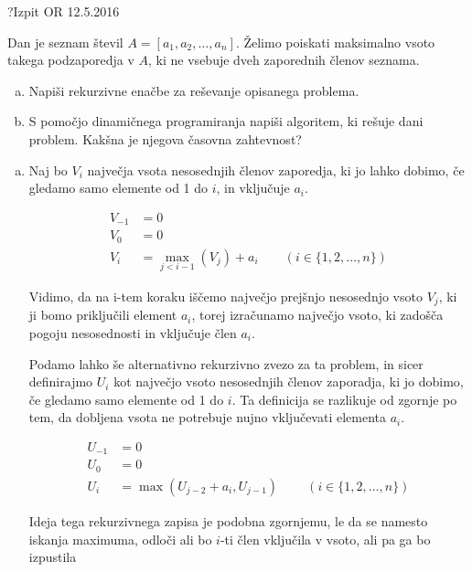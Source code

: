 \begin{naloga}{?}{Izpit OR 12.5.2016}
\begin{vprasanje}
Dan je seznam števil $A = [a_1, a_2, \dots, a_n]$.
Želimo poiskati maksimalno vsoto takega podzaporedja v $A$,
ki ne vsebuje dveh zaporednih členov seznama.

\begin{enumerate}[(a)]
\item Napiši rekurzivne enačbe za reševanje opisanega problema.

\item S pomočjo dinamičnega programiranja napiši algoritem,
ki rešuje dani problem.
Kakšna je njegova časovna zahtevnost?
\end{enumerate}
\end{vprasanje}
\begin{odgovor}

\begin{enumerate}[(a)]

\item Naj bo $V_i$ največja vsota nesosednjih členov zaporedja, ki jo lahko dobimo,
če gledamo samo elemente od 1 do $i$, in vključuje $a_i$.

\begin{align*}
V_{-1} &= 0 \\
V_0 &= 0 \\
V_i &= \max_{j < i - 1}\left(V_j\right) + a_i
\qquad (i \in \{1, 2, \dots, n\})
\end{align*}

Vidimo, da na i-tem koraku iščemo največjo prejšnjo nesosednjo vsoto $V_j$, 
ki ji bomo priključili element $a_i$, torej izračunamo največjo vsoto, 
ki zadošča pogoju nesosednosti in vključuje člen $a_i$.

Podamo lahko še alternativno rekurzivno zvezo za ta problem, in sicer 
definirajmo $U_i$ kot največjo vsoto nesosednjih členov zaporadja, ki jo dobimo, 
če gledamo samo elemente od 1 do $i$.
Ta definicija se razlikuje od zgornje po tem, da dobljena vsota ne potrebuje nujno 
vključevati elementa $a_i$.

\begin{align*}
U_{-1} &= 0 \\
U_0 &= 0 \\
U_i &= \max\left(U_{j - 2} + a_i, U_{j - 1}\right)
\qquad\ \left(i \in \{1, 2, \dots, n\}\right)
\end{align*}

Ideja tega rekurzivnega zapisa je podobna zgornjemu,
le da se namesto iskanja maximuma, odloči ali bo $i$-ti člen vključila v vsoto, 
ali pa ga bo izpustila


\end{enumerate}
\end{odgovor}
\end{naloga}
